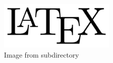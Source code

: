 \documentclass{article}
\begin{document}
\graphicspath{{./img/}}

\begin{figure}
    \centering
    \includegraphics[width=0.5\textwidth]{latex_logo.png}
    \caption{Image from subdirectory}
\end{figure}
\end{document}
